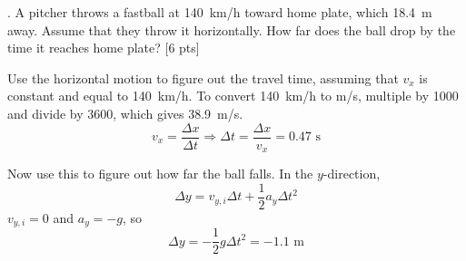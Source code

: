 \documentclass[11pt,letterpaper]{article}
\newcommand{\sol}[1]{{\color{NavyBlue} #1}}
\begin{document}
. A pitcher throws a fastball at 140~km/h toward home plate, which 18.4~m away. Assume that they throw it horizontally. How far does the ball drop by the time it reaches home plate? [6 pts]

\sol{Use the horizontal motion to figure out the travel time, assuming that $v_x$ is constant and equal to 140~km/h. To convert 140~km/h to m/s, multiple by 1000 and divide by 3600, which gives 38.9~m/s.
\begin{equation}
v_x = \frac{\Delta x}{\Delta t} \Rightarrow \Delta t = \frac{\Delta x}{v_x} = 0.47\mbox{ s}
\end{equation}

Now use this to figure out how far the ball falls. In the $y$-direction,
\begin{equation}
\Delta y = v_{y,i}\Delta t + \frac{1}{2}a_y\Delta t^2
\end{equation}
$v_{y,i}=0$ and $a_y=-g$, so
\begin{equation}
\Delta y = -\frac{1}{2}g\Delta t^2 = \boxed{-1.1\mbox{ m}}
\end{equation}


}
\end{document}
